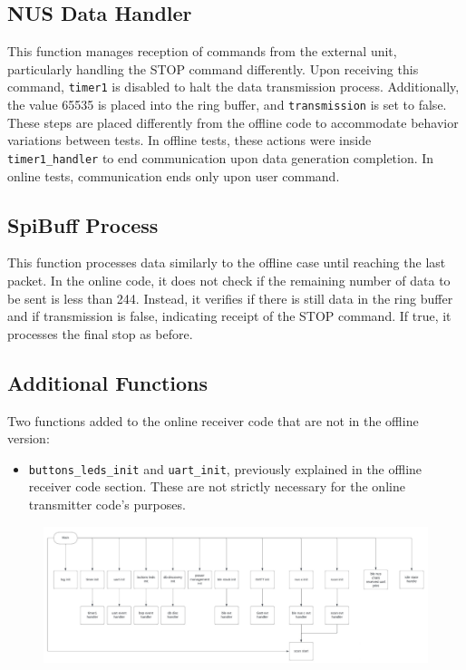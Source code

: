 \documentclass{Configuration_Files/PoliMi3i_thesis}
\begin{document}
\subsection*{NUS Data Handler}
This function manages reception of commands from the external unit, particularly handling the STOP command differently. Upon receiving this command, \texttt{timer1} is disabled to halt the data transmission process. Additionally, the value 65535 is placed into the ring buffer, and \texttt{transmission} is set to false. These steps are placed differently from the offline code to accommodate behavior variations between tests. In offline tests, these actions were inside \texttt{timer1\_handler} to end communication upon data generation completion. In online tests, communication ends only upon user command.

\subsection*{SpiBuff Process}
This function processes data similarly to the offline case until reaching the last packet. In the online code, it does not check if the remaining number of data to be sent is less than 244. Instead, it verifies if there is still data in the ring buffer and if transmission is false, indicating receipt of the STOP command. If true, it processes the final stop as before.

\subsection*{Additional Functions}
Two functions added to the online receiver code that are not in the offline version:
\begin{itemize}
    \item \texttt{buttons\_leds\_init} and \texttt{uart\_init}, previously explained in the offline receiver code section. These are not strictly necessary for the online transmitter code's purposes.
\end{itemize}

\begin{figure}[H]
	\includegraphics[scale=0.3]{Previous Implementation/Screenshot 2024-08-15 at 11.01.10.png}
	\centering
\end{figure}
\end{document}
